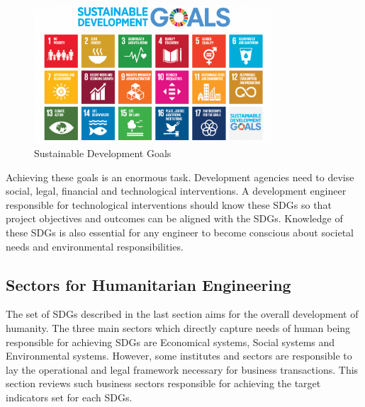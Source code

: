 \documentclass[10pt]{IETBook}
\begin{document}
\begin{figure}
\centering
	\includegraphics[width=3.5in]{SDGs}
	\caption{Sustainable Development Goals}
\end{figure}

Achieving these goals is an enormous task. Development agencies need to devise social, legal, financial and technological interventions. A development engineer responsible for technological interventions should know these SDGs so that project objectives and outcomes can be aligned with the SDGs. Knowledge of these SDGs is also essential for any engineer to become conscious about societal needs and environmental responsibilities.

\subsection{Sectors for Humanitarian Engineering}
The set of SDGs described in the last section aims for the overall development of humanity. The three main sectors which directly capture needs of human being responsible for achieving SDGs are Economical systems, Social systems and Environmental systems. However, some institutes and sectors are responsible to lay the operational and legal framework necessary for business transactions. This section reviews such business sectors responsible for achieving the target indicators set for each SDGs.
\end{document}
